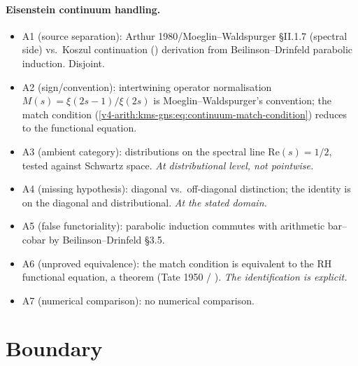 \paragraph{Eisenstein continuum handling.}
\begin{itemize}
\item A1 (source separation): Arthur 1980/Moeglin--Waldspurger
\S II.1.7 (spectral side) vs.~Koszul continuation
() derivation from
Beilinson--Drinfeld parabolic induction. Disjoint.
\item A2 (sign/convention): intertwining operator normalisation
\(M(s)=\xi(2s-1)/\xi(2s)\) is Moeglin--Waldspurger's convention; the
match condition (\ref{v4-arith:kms-gns:eq:continuum-match-condition})
reduces to the functional equation.
\item A3 (ambient category): distributions on the spectral line
\(\mathrm{Re}(s)=1/2\), tested against Schwartz space.
\emph{At distributional level, not pointwise.}
\item A4 (missing hypothesis): diagonal vs.~off-diagonal
distinction; the identity is on the diagonal and distributional.
\emph{At the stated domain.}
\item A5 (false functoriality): parabolic induction commutes with
arithmetic bar--cobar by Beilinson--Drinfeld \S3.5.
\item A6 (unproved equivalence): the match condition is equivalent
to the RH functional equation, a theorem (Tate 1950 /
). \emph{The identification is explicit.}
\item A7 (numerical comparison): no numerical comparison.
\end{itemize}

\section{Boundary}
\label{v4-arith:kms-gns:summary}

